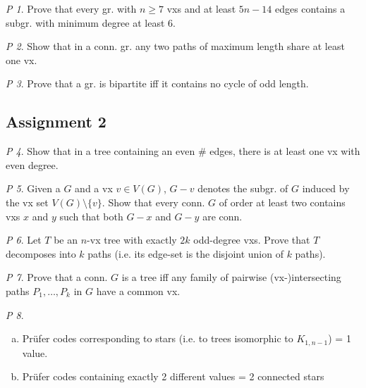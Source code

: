 \documentclass[11pt, fleqn, a4paper, landscape]{article}
\theoremstyle{plain} %
\theoremstyle{remark} %
\newtheorem{problem}{P}
\theoremstyle{definition} %
\begin{document}
\begin{multicols}{5}
\begin{problem}
Prove that every gr. with $n \ge 7$ vxs and at least $5n- 14$ edges contains a subgr. with minimum degree at least 6.
\end{problem}

\begin{problem}
Show that in a conn. gr. any two paths of maximum length share at least
one vx.
\end{problem}

\begin{problem}
Prove that a gr. is bipartite iff it contains no cycle of odd length.
\end{problem}

\subsection{Assignment 2}

\begin{problem}
Show that in a tree containing an even \# edges, there is at least one
vx with even degree.
\end{problem}

\begin{problem}
Given a $G$ and a vx $v \in V (G)$, $G - v$ denotes the subgr. of $G$ induced by the vx set $V (G)\setminus\{v\}$. Show that every conn. $G$ of order at least two contains vxs $x$ and $y$ such that both $G- x$ and $G-y$ are conn.
\end{problem}

\begin{problem}
Let $T$ be an $n$-vx tree with exactly $2k$ odd-degree vxs. Prove that $T$ decomposes into $k$ paths (i.e. its edge-set is the disjoint union of $k$ paths).
\end{problem}

\begin{problem}
Prove that a conn. $G$ is a tree iff any family of pairwise (vx-)intersecting paths $P_1,\dots,P_k$ in $G$ have a common vx.
\end{problem}

\begin{problem}
\begin{enumerate}[(a)]
\item Prüfer codes corresponding to stars (i.e. to trees isomorphic to $K_{1,n-1}$) = 1 value.
\item Prüfer codes containing exactly 2 different values = 2 connected stars
\end{enumerate}
\end{problem}


\end{multicols}
\end{document}
